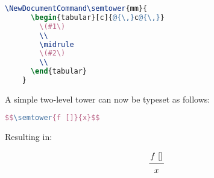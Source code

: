\documentclass[nols,twoside,nofonts,nobib,nohyper,showframe]{tufte-handout}
\begin{document}
\begin{appendices}
  \begin{lstlisting}[language=TeX]
    \NewDocumentCommand\semtower{mm}{
      \begin{tabular}[c]{@{\,}c@{\,}}
        \(#1\)
        \\
        \midrule
        \(#2\)
        \\
      \end{tabular}
    }
  \end{lstlisting}

  A simple two-level tower can now be typeset as follows:

    \begin{lstlisting}[language=TeX]
      $$\semtower{f []}{x}$$
  \end{lstlisting}

  Resulting in:

  $$\semtower{f []}{x}$$

  \end{appendices}
\end{document}
